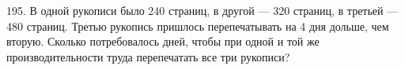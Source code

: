 195. В одной рукописи было 240 страниц, в другой --- 320 страниц, в третьей --- 480 страниц. Третью рукопись пришлось перепечатывать на 4 дня дольше, чем вторую. Сколько потребовалось дней, чтобы при одной и той же производительности труда перепечатать все три рукописи?\\
